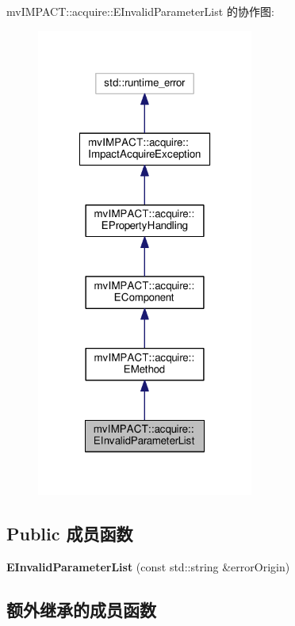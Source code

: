 mv\+I\+M\+P\+A\+C\+T\+:\+:acquire\+:\+:E\+Invalid\+Parameter\+List 的协作图\+:
\nopagebreak
\begin{figure}[H]
\begin{center}
\leavevmode
\includegraphics[width=202pt]{classmv_i_m_p_a_c_t_1_1acquire_1_1_e_invalid_parameter_list__coll__graph}
\end{center}
\end{figure}
\subsection*{Public 成员函数}
\begin{DoxyCompactItemize}
\item 
\hypertarget{classmv_i_m_p_a_c_t_1_1acquire_1_1_e_invalid_parameter_list_a929a51d9fcb5fb97e75bf4dfba50ee37}{{\bfseries E\+Invalid\+Parameter\+List} (const std\+::string \&error\+Origin)}\label{classmv_i_m_p_a_c_t_1_1acquire_1_1_e_invalid_parameter_list_a929a51d9fcb5fb97e75bf4dfba50ee37}

\end{DoxyCompactItemize}
\subsection*{额外继承的成员函数}


